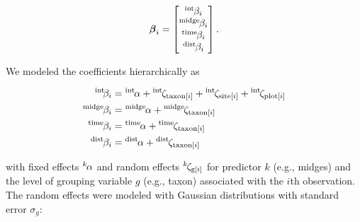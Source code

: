 \begin{equation} \label{eq:beta-vec}
{\boldsymbol\beta}_i = \begin{bmatrix}
    {}^\text{int}\hspace*{-1pt}\beta_i \\
    {}^\text{midge}\hspace*{-1pt}\beta_i \\
    {}^\text{time}\hspace*{-1pt}\beta_i \\
    {}^\text{dist}\hspace*{-1pt}\beta_i
    \end{bmatrix}\text{.}
\end{equation}

\noindent We modeled the coefficients hierarchically \citep[following][]{Jackson2012} as

\begin{equation} \label{eq:betas}
\begin{split}
    {}^\text{int}\hspace*{-2pt}\beta_i &= {}^\text{int}\hspace*{-1pt}\alpha +
        {}^\text{int}\hspace*{-1pt}\zeta_{\text{taxon}[i]} +
        {}^\text{int}\hspace*{-1pt}\zeta_{\text{site}[i]} +
        {}^\text{int}\hspace*{-1pt}\zeta_{\text{plot}[i]} \\
    {}^\text{midge}\hspace*{-1pt}\beta_i &= {}^\text{midge}\hspace*{-1pt}\alpha +
            {}^\text{midge}\hspace*{-1pt}\zeta_{\text{taxon}[i]} \\
    {}^\text{time}\hspace*{-1pt}\beta_i &= {}^\text{time}\hspace*{-1pt}\alpha +
            {}^\text{time}\hspace*{-1pt}\zeta_{\text{taxon}[i]} \\
    {}^\text{dist}\hspace*{-1pt}\beta_i &= {}^\text{dist}\hspace*{-1pt}\alpha +
            {}^\text{dist}\hspace*{-1pt}\zeta_{\text{taxon}[i]}
\end{split}
\end{equation}

\noindent with fixed effects ${}^k\hspace*{-1pt}\alpha$ and random effects
${}^k\hspace*{-1pt}\zeta_{\text{g}[i]}$ for predictor $k$ (e.g., midges)
and the level of grouping variable $g$ (e.g., taxon) associated  with the $i$th observation.
The random effects were modeled with Gaussian distributions with
standard error $\sigma_g$:

